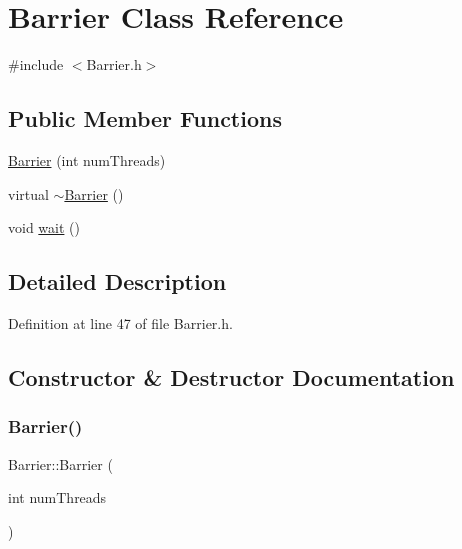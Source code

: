 \hypertarget{class_barrier}{}\section{Barrier Class Reference}
\label{class_barrier}


{\ttfamily \#include $<$Barrier.\+h$>$}

\subsection*{Public Member Functions}
\begin{DoxyCompactItemize}
\item 
\hyperlink{class_barrier_a7290fb8952d0f7779b8d6a7a34bbd407}{Barrier} (int num\+Threads)
\item 
virtual \hyperlink{class_barrier_aa913b6dd26448ae765d581a276749860}{$\sim$\+Barrier} ()
\item 
void \hyperlink{class_barrier_a83a9d2e85e98b3d2081538bf0da29b60}{wait} ()
\end{DoxyCompactItemize}


\subsection{Detailed Description}


Definition at line 47 of file Barrier.\+h.



\subsection{Constructor \& Destructor Documentation}
\mbox{\label{class_barrier_a7290fb8952d0f7779b8d6a7a34bbd407}} 
\subsubsection{\texorpdfstring{Barrier()}{Barrier()}}
{\footnotesize\ttfamily Barrier\+::\+Barrier (\begin{DoxyParamCaption}\item[{int}]{num\+Threads }\end{DoxyParamCaption})}

\mbox{\label{class_barrier_aa913b6dd26448ae765d581a276749860}} 
